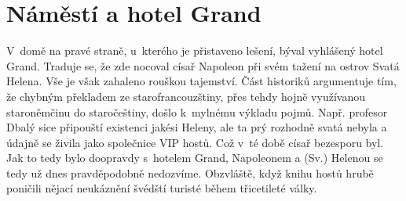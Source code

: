 
\chapter{Náměstí a hotel Grand}


V~domě na pravé straně, u~kterého je přistaveno lešení, býval vyhlášený hotel
Grand. Traduje se, že zde nocoval císař Napoleon při svém tažení na ostrov
Svatá Helena. Vše je však zahaleno rouškou tajemství. Část historiků
argumentuje tím, že chybným překladem ze starofrancouzštiny, přes tehdy hojně
využívanou staroněmčinu do staročeštiny, došlo k~mylnému výkladu pojmů. Např.
profesor Dbalý sice připouští existenci jakési Heleny, ale ta prý rozhodně
svatá nebyla a údajně se živila jako společnice VIP hostů. Což v~té době císař
bezesporu byl. Jak to tedy bylo doopravdy s~hotelem Grand, Napoleonem a (Sv.)
Helenou se tedy už dnes pravděpodobně nedozvíme. Obzvláště, když knihu hostů
hrubě poničili nějací neukáznění švédští turisté během třicetileté války.


